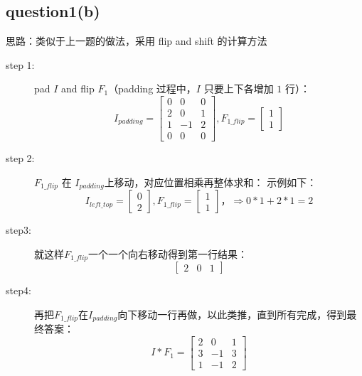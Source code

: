 \documentclass[a4paper,UTF8]{article}
\numberwithin{equation}{section}
\begin{document}
\subsection{question1(b)}
思路：类似于上一题的做法，采用 flip and shift 的计算方法
\begin{description}
\item[step 1:]pad $I$ and flip $F_1$（padding 过程中，$I$ 只要上下各增加 $1$ 行）：
\begin{equation}
I_{padding}={
\left[ \begin{array}{ccc}
0 & 0 & 0\\
2 & 0 & 1\\
1 & -1 & 2\\
0 & 0 & 0
\end{array} 
\right ]},
F_{1\_flip}={
\left[ \begin{array}{c}
1\\
1
\end{array}
\right ]}
\end{equation}
\item[step 2:] $F_{1\_flip}$ 在 $I_{padding}$上移动，对应位置相乘再整体求和：
示例如下：
\begin{equation}
I_{left\_top}={
\left[ \begin{array}{c}
0 \\
2
\end{array} 
\right ]},
F_{1\_flip}={
\left[ \begin{array}{c}
1\\
1
\end{array}
\right ]}，
\Rightarrow 0*1+2*1=2
\end{equation}
\item[step3:] 就这样$F_{1\_flip}$一个一个向右移动得到第一行结果：
\begin{equation}
{
\left[ \begin{array}{ccc}
2&0&1
\end{array} 
\right ]}
\end{equation}
\item[step4:] 再把$F_{1\_flip}$在$I_{padding}$向下移动一行再做，以此类推，直到所有完成，得到最终答案：
\begin{equation}
I*F_1={
\left[ \begin{array}{cccc}
2&0&1\\
3&-1&3\\
1&-1&2
\end{array}
\right ]}
\end{equation}
\end{description}
\end{document}
